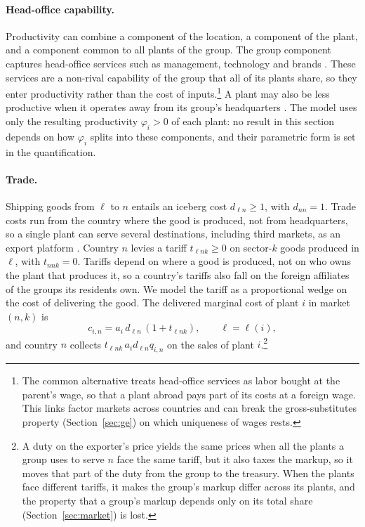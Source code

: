 \documentclass[11pt]{article}
\begin{document}
\paragraph{Head-office capability.} Productivity can combine a component of the
location, a component of the plant, and a component common to all plants of the
group. The group component captures head-office services such as management,
technology and brands \citep{Antras2003,AntrasHelpman2004}. These services are a
non-rival capability of the group that all of its plants share, so they enter
productivity rather than the cost of inputs.\footnote{The common alternative treats
head-office services as labor bought at the parent's wage, so that a plant abroad pays
part of its costs at a foreign wage. This links factor markets across countries and
can break the gross-substitutes property (Section~\ref{sec:ge}) on which uniqueness of
wages rests.} A plant may also be less productive when it operates away from its group's
headquarters \citep{RamondoRodriguezClare2013,HeadMayer2019}. The model uses only the
resulting productivity $\varphi_i>0$ of each plant: no result in this section depends on
how $\varphi_i$ splits into these components, and their parametric form is set in the
quantification.

\paragraph{Trade.} Shipping goods from $\ell$ to $n$ entails an iceberg cost
$d_{\ell n}\ge1$, with $d_{nn}=1$. Trade costs run from the country where the good is
produced, not from headquarters, so a single plant can serve several destinations,
including third markets, as an export platform \citep{Tintelnot2017}. Country $n$
levies a tariff $t_{\ell nk}\ge0$ on sector-$k$ goods produced in $\ell$, with
$t_{nnk}=0$. Tariffs depend on where a good is produced, not on who owns the plant that
produces it, so a country's tariffs also fall on the foreign affiliates of the groups
its residents own. We model the tariff as a proportional wedge on the cost of
delivering the good. The delivered marginal cost of plant $i$ in market $(n,k)$ is
\begin{equation}
  c_{i,n}=a_i\,d_{\ell n}\,(1+t_{\ell nk}),\qquad \ell=\ell(i),
  \label{eq:delivered}
\end{equation}
and country $n$ collects $t_{\ell nk}\,a_id_{\ell n}q_{i,n}$ on the sales of plant
$i$.\footnote{A duty on the exporter's price yields the same prices when all the plants a
group uses to serve $n$ face the same tariff, but it also taxes the markup, so it
moves that part of the duty from the group to the treasury. When the plants face
different tariffs, it makes the group's markup differ across its plants, and the
property that a group's markup depends only on its total share
(Section~\ref{sec:market}) is lost.}
\end{document}

